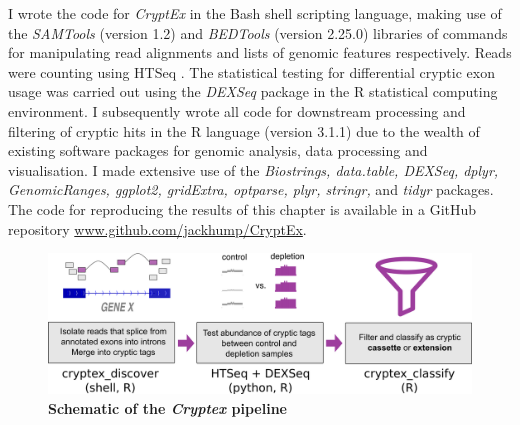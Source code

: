 I wrote the code for \textit{CryptEx} in the Bash shell scripting language, making use of the \emph{SAMTools} (version 1.2) \citep{Li2009-hm} and \emph{BEDTools} (version 2.25.0) \citep{Quinlan2010-up} libraries of commands for manipulating read alignments and lists of genomic features respectively. Reads were counting using HTSeq \citep{Anders2015-wz}. The statistical testing for differential cryptic exon usage was carried out using the \textit{DEXSeq} package \citep{Anders2012} in the R statistical computing environment. I subsequently wrote all code for downstream processing and filtering of cryptic hits in the R language (version 3.1.1) due to the wealth of existing software packages for genomic analysis, data processing and visualisation. I made extensive use of the \emph{Biostrings, data.table, DEXSeq, dplyr, GenomicRanges, ggplot2, gridExtra, optparse, plyr, stringr,} and \emph{tidyr} packages. The code for reproducing the results of this chapter is available in a GitHub repository \url{www.github.com/jackhump/CryptEx}.

\begin{figure}
	\centering
	\includegraphics[width=14cm]{Figures/03_cryptic_exons/cryptex_pipeline.png}
	\caption[Schematic of the \textit{Cryptex} pipeline]{
		\textbf{Schematic of the \textit{Cryptex} pipeline}
	}
	\label{fig:cryptic_workflow}
\end{figure}

